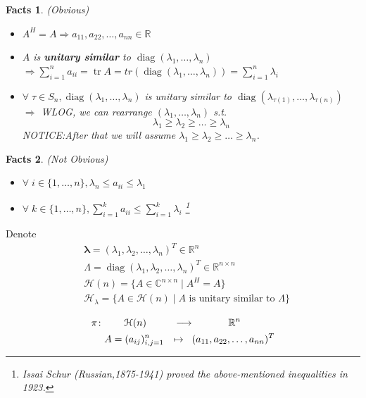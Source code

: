 \documentclass[11pt]{amsart}
\numberwithin{equation}{section}
\theoremstyle{plain}
\newtheorem*{fact}{Facts}
\theoremstyle{plain}
\numberwithin{equation}{section}
\theoremstyle{remark}
\DeclareMathOperator{\diag}{diag}
\DeclareMathOperator{\tr}{tr}
\begin{document}
\begin{fact}(Obvious)
	\begin{itemize}
		\item $A^H=A \Rightarrow a_{11},a_{22},\ldots,a_{nn} \in \mathbb{R}$
		\item $A$ is \textbf{unitary similar} to $\diag(\lambda_1,\ldots,\lambda_n)$ \\
		$\Rightarrow \sum_{i=1}^n a_{ii} = \tr A = tr (\diag(\lambda_1,\ldots,\lambda_n))= \sum_{i=1}^n \lambda_i$
		\item $\forall\; \tau \in S_n, \diag (\lambda_1,\ldots,\lambda_n)$ is unitary similar to
		$\diag (\lambda_{\tau(1)},\ldots,\lambda_{\tau(n)})$ \\
		$\Rightarrow$ WLOG, we can rearrange $(\lambda_1,\ldots,\lambda_n)$ s.t.
		$$\lambda_1 \geqslant \lambda_2\geqslant\ldots\geqslant\lambda_n$$
		NOTICE:After that we will assume $\lambda_1 \geqslant \lambda_2\geqslant\ldots\geqslant\lambda_n$.
	\end{itemize}
\end{fact}
\begin{fact}(Not Obvious)
	\begin{itemize}
		\item $\forall\; i \in \{1,\ldots, n\}, \lambda_n \leqslant a_{ii} \leqslant \lambda_1$
		\item $\forall\; k \in \{1,\ldots, n\}, \sum_{i=1}^k a_{ii} \leqslant \sum_{i=1}^k \lambda_i$ 
		\footnote{Issai Schur (Russian,1875-1941) proved the above-mentioned
			inequalities in 1923.}
	\end{itemize}
\end{fact}
Denote
\begin{align*}
	&\bm{\lambda} =(\lambda_1,\lambda_2,\ldots,\lambda_n)^T \in \mathbb{R}^n \\
	&\Lambda =\diag (\lambda_1,\lambda_2,\ldots,\lambda_n)^T \in \mathbb{R}^{n \times n} \\
	&\mathcal{H} (n)=\{A \in \mathbb{C}^{n \times n} \mid A^H=A\} \\
	&\mathcal{H}_\lambda=\{A \in \mathcal{H} (n) \mid A \text{ is unitary similar to } \Lambda\} \\
	\end{align*}
\begin{equation*}
	\begin{aligned}	
		\pi \colon & \qquad \mathcal{H} (n) &\longrightarrow &\hspace{1.3cm}  \mathbb{R}^n \\
		&A=(a_{ij})_{i,j=1}^n &\mapsto \hspace{0.3cm}&(a_{11},a_{22},\ldots,a_{nn})^T
	\end{aligned}
\end{equation*}
\end{document}
